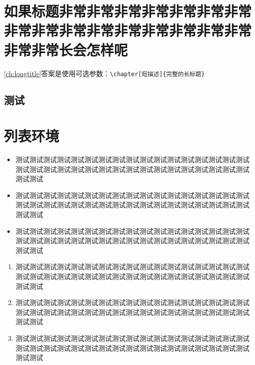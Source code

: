 \documentclass{njuthesis}
\begin{document}
\section[还是用短点的吧]{如果标题非常非常非常非常非常非常非常非常非常非常非常非常非常非常非常非常非常非常长会怎样呢}
\cref{ch:longtitle}答案是使用可选参数：\verb+\chapter[短描述]{完整的长标题}+

\zhlipsum[1-10][name=zhufu]

\subsection{测试}

\zhlipsum[11-20][name=zhufu]

\section{列表环境}

\begin{itemize}
    \item 测试测试测试测试测试测试测试测试测试测试测试测试测试测试测试测试测试测试测试测试测试测试测试测试测试测试测试测试测试测试测试测试测试测试测试测试
    \item 测试测试测试测试测试测试测试测试测试测试测试测试测试测试测试测试测试测试测试测试测试测试测试测试测试测试测试测试测试测试测试测试测试测试测试测试
    \item 测试测试测试测试测试测试测试测试测试测试测试测试测试测试测试测试测试测试测试测试测试测试测试测试测试测试测试测试测试测试测试测试测试测试测试测试
\end{itemize}

\begin{enumerate}
    \item 测试测试测试测试测试测试测试测试测试测试测试测试测试测试测试测试测试测试测试测试测试测试测试测试测试测试测试测试测试测试测试测试测试测试测试测试
    \item 测试测试测试测试测试测试测试测试测试测试测试测试测试测试测试测试测试测试测试测试测试测试测试测试测试测试测试测试测试测试测试测试测试测试测试测试
    \item 测试测试测试测试测试测试测试测试测试测试测试测试测试测试测试测试测试测试测试测试测试测试测试测试测试测试测试测试测试测试测试测试测试测试测试测试
\end{enumerate}
\end{document}

